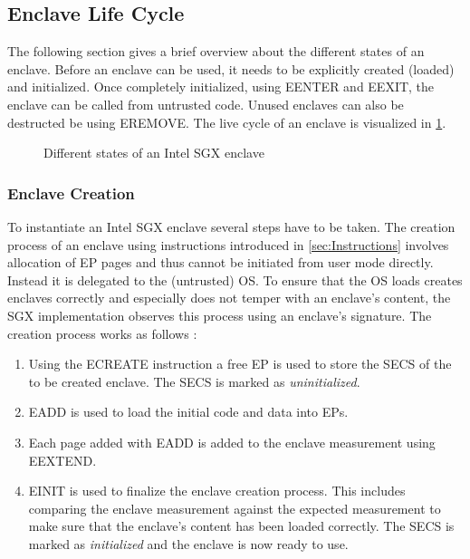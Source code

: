 \subsection{Enclave Life Cycle}
The following section gives a brief overview about the different states of an enclave. Before an enclave can be used, it needs to be explicitly created (loaded) and initialized.
Once completely initialized, using EENTER and EEXIT, the enclave can be called from untrusted code. Unused enclaves can also be destructed be using EREMOVE. The live cycle of an
enclave is visualized in \cref{fig:enclaveLifeCycle}.

\begin{figure}[h]
    \centering
    \caption{Different states of an Intel SGX enclave \cite{Costan2016IntelSE}}
    \label{fig:enclaveLifeCycle}
\end{figure}

\subsubsection{Enclave Creation}
To instantiate an Intel SGX enclave several steps have to be taken. The creation process of an enclave using instructions introduced in \cref{sec:Instructions} involves allocation
of EP pages and thus cannot be initiated from user mode directly. Instead it is delegated to the (untrusted) OS. To ensure that the OS loads creates enclaves correctly and
especially does not temper with an enclave's content, the SGX implementation observes this process using an enclave's signature. The creation process works as follows
\cite{Costan2016IntelSE}:
\begin{enumerate}
    \item Using the ECREATE instruction a free EP is used to store the SECS of the to be created enclave. The SECS is marked as \textit{uninitialized}.
    \item EADD is used to load the initial code and data into EPs.
    \item Each page added with EADD is added to the enclave measurement using EEXTEND.
    \item EINIT is used to finalize the enclave creation process. This includes comparing the enclave measurement against the expected measurement to make sure that the enclave's
          content has been loaded correctly. The SECS is marked as \textit{initialized} and the enclave is now ready to use.
\end{enumerate}

